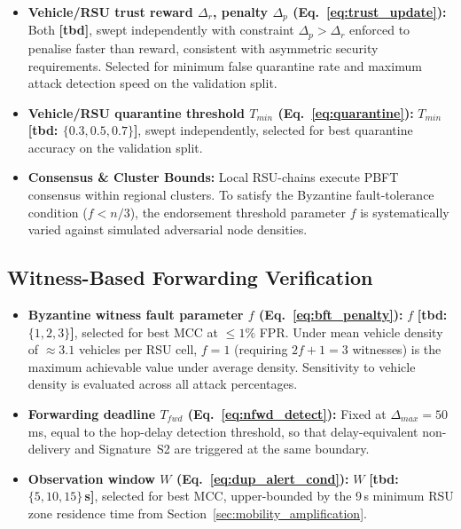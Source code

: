 \documentclass[12pt, a4paper]{report}
\begin{document}
{{\begin{itemize}
    \item \textbf{Vehicle/RSU trust reward $\Delta_r$,
    penalty $\Delta_p$
    (Eq.~\ref{eq:trust_update}):}
    Both \textbf{[tbd]}, swept independently with
    constraint $\Delta_p > \Delta_r$ enforced to
    penalise faster than reward, consistent with
    asymmetric security requirements. Selected for
    minimum false quarantine rate and maximum
    attack detection speed on the validation split.

    \item \textbf{Vehicle/RSU quarantine threshold
    $T_{min}$ (Eq.~\ref{eq:quarantine}):}
    $T_{min}$ \textbf{[tbd: $\{0.3, 0.5, 0.7\}$]},
    swept independently, selected for best
    quarantine accuracy on the validation split.



    
    \item \textbf{Consensus \& Cluster Bounds:} Local RSU-chains execute PBFT consensus within regional clusters. To satisfy the Byzantine fault-tolerance condition ($f < n/3$), the endorsement threshold parameter $f$ is systematically varied against simulated adversarial node densities.

\end{itemize}

\subsection{Witness-Based Forwarding Verification}
\begin{itemize}
    \item \textbf{Byzantine witness fault parameter
    $f$ (Eq.~\ref{eq:bft_penalty}):}
    $f$ \textbf{[tbd: $\{1, 2, 3\}$]}, selected
    for best MCC at $\leq 1\%$ FPR. Under mean
    vehicle density of $\approx 3.1$ vehicles per
    RSU cell, $f{=}1$ (requiring $2f{+}1{=}3$
    witnesses) is the maximum achievable value
    under average density. Sensitivity to vehicle
    density is evaluated across all attack
    percentages.

    \item \textbf{Forwarding deadline $T_{fwd}$
    (Eq.~\ref{eq:nfwd_detect}):}
    Fixed at $\Delta_{max} = 50$\,ms, equal to
    the hop-delay detection threshold, so that
    delay-equivalent non-delivery and Signature~S2
    are triggered at the same boundary.

    \item \textbf{Observation window $W$
    (Eq.~\ref{eq:dup_alert_cond}):}
    $W$ \textbf{[tbd: $\{5, 10, 15\}$\,s]},
    selected for best MCC, upper-bounded by the
    9\,s minimum RSU zone residence time from
    Section~\ref{sec:mobility_amplification}.
\end{itemize}


}}
\end{document}
